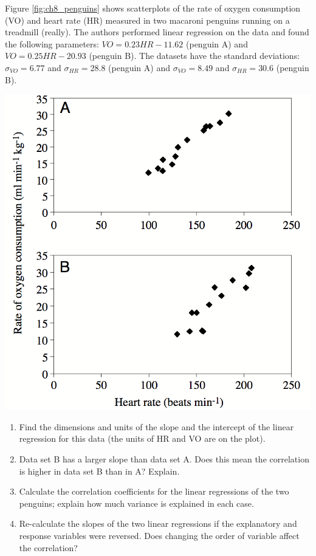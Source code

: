 \documentclass[
]{book}
\theoremstyle{definition}
\theoremstyle{definition}
\theoremstyle{definition}
\theoremstyle{remark}
\begin{document}
Figure \ref{fig:ch8_penguins} shows scatterplots of the rate of oxygen consumption (VO) and heart rate (HR) measured in two macaroni penguins running on a treadmill (really). The authors performed linear regression on the data and found the following parameters: \(VO =0.23HR - 11.62\) (penguin A) and \(VO =0.25HR - 20.93\) (penguin B). The datasets have the standard deviations: \(\sigma_{VO} = 6.77\) and \(\sigma_{HR} = 28.8\) (penguin A) and \(\sigma_{VO} = 8.49\) and \(\sigma_{HR} = 30.6\) (penguin B).

\includegraphics{ch8/penguin_HR.png}
\label{fig:ch8_penguins}

\begin{enumerate}
\def\labelenumi{\arabic{enumi}.}
\item
  Find the dimensions and units of the slope and the intercept of the linear regression for this data (the units of HR and VO are on the plot).
\item
  Data set B has a larger slope than data set A. Does this mean the correlation is higher in data set B than in A? Explain.
\item
  Calculate the correlation coefficients for the linear regressions of the two penguins; explain how much variance is explained in each case.
\item
  Re-calculate the slopes of the two linear regressions if the explanatory and response variables were reversed. Does changing the order of variable affect the correlation?
\end{enumerate}
\end{document}
